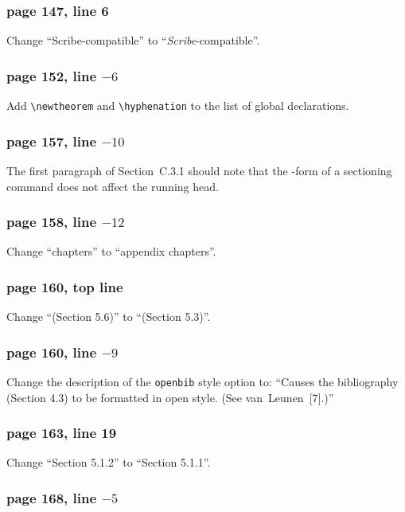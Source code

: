 \subsubsection*{page 147, line 6}

Change ``Scribe-compatible'' to ``{\em Scribe\/}-compatible''.

\subsubsection*{page 152, line $-6$}
Add \verb|\newtheorem| and \verb|\hyphenation| to the list
of global declarations.


\subsubsection*{page 157, line $-10$}
The first paragraph of Section~C.3.1 should note that the {\tt *}-form
of a sectioning command does not affect the running head.


\subsubsection*{page 158, line $-12$}
Change ``chapters'' to ``appendix chapters''.

\subsubsection*{page 160, top line}

Change ``(Section 5.6)'' to ``(Section 5.3)''.

\subsubsection*{page 160, line $-9$}

Change the description of the {\tt openbib} style option to: ``Causes
the bibliography (Section 4.3) to be formatted in open style.  (See
van~Leunen~[7].)''


\subsubsection*{page 163, line 19}
Change ``Section 5.1.2'' to ``Section 5.1.1''.

\subsubsection*{page 168, line $-5$}

